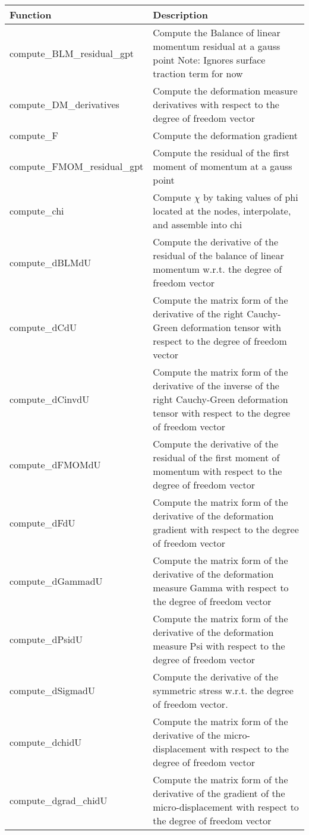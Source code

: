 \documentclass{asme2ej}
\begin{document}
\begin{longtable}{ p{}  p{} }
\hline
Function & Description\\
\hline
\hline
compute\_BLM\_residual\_gpt & Compute the Balance of linear momentum residual at a gauss point Note: Ignores surface traction term for now\\
compute\_DM\_derivatives &Compute the deformation measure derivatives with respect to the degree of freedom vector\\
compute\_F & Compute the deformation gradient\\
compute\_FMOM\_residual\_gpt & Compute the residual of the first moment of momentum at a gauss point\\
compute\_chi & Compute $\chi$ by taking values of phi located at the nodes, interpolate, and assemble into chi\\
compute\_dBLMdU & Compute the derivative of the residual of the balance of linear momentum w.r.t. the degree of freedom vector\\
compute\_dCdU & Compute the matrix form of the derivative of the right Cauchy-Green deformation tensor with respect to the degree of freedom vector\\
compute\_dCinvdU & Compute the matrix form of the derivative of the inverse of the right Cauchy-Green deformation tensor with respect to the degree of freedom vector\\
compute\_dFMOMdU & Compute the derivative of the residual of the first moment of momentum with respect to the degree of freedom vector\\
compute\_dFdU & Compute the matrix form of the derivative of the deformation gradient with respect to the degree of freedom vector\\
compute\_dGammadU & Compute the matrix form of the derivative of the deformation measure Gamma with respect to the degree of freedom vector\\  
compute\_dPsidU & Compute the matrix form of the derivative of the deformation measure Psi with respect to the degree of freedom vector\\
compute\_dSigmadU & Compute the derivative of the symmetric stress w.r.t. the degree of freedom vector.\\
compute\_dchidU & Compute the matrix form of the derivative of the micro-displacement with respect to the degree of freedom vector\\
compute\_dgrad\_chidU & Compute the matrix form of the derivative of the gradient of the micro-displacement with respect to the degree of freedom vector\\

\end{longtable}
\end{document}
